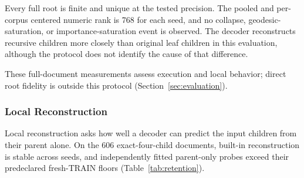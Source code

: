 \documentclass[10pt]{article}
\begin{document}


\begin{table}[H]
\caption{Unrestricted full-document recursion. Throughput covers recursive
merger and decoder evaluation over cached leaves, including shard loading,
hash and structure validation, device transfers, and telemetry. It excludes
tokenization and teacher leaf embedding and is not a merger-only kernel
benchmark.}
\label{tab:full-document}
\centering
\small
{}
\end{table}

Every full root is finite and unique at the tested precision. The pooled and
per-corpus centered numeric rank is 768 for each seed, and no collapse,
geodesic-saturation, or importance-saturation event is observed. The decoder
reconstructs recursive children more closely than original leaf children in
this evaluation, although the protocol does not identify the cause of that
difference.

These full-document measurements assess execution and local behavior; direct
root fidelity is outside this protocol (Section~\ref{sec:evaluation}).

\subsubsection{Local Reconstruction}
\label{sec:retention-results}

Local reconstruction asks how well a decoder can predict the input children
from their parent alone. On the 606 exact-four-child documents, built-in reconstruction is stable across
seeds, and independently fitted parent-only probes exceed their predeclared
fresh-TRAIN floors (Table~\ref{tab:retention}).
\end{document}

